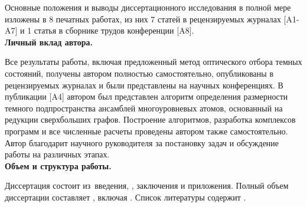 Основные положения и выводы диссертационного исследования в полной мере изложены в 8 печатных работах, из них 7 статей в рецензируемых журна­лах [A1-A7] и 1 статья в сборнике трудов конференции [A8].
\
\\[18pt]
\indent\textbf{Личный вклад автора.}

Все результаты работы, включая предложенный метод оптического отбора темных состояний, получены автором полностью самостоятельно, опубликова­ны в рецензируемых журналах и были представлены на научных конференциях. В публикации [A4] автором был представлен алгоритм определения размерно­сти темного подпространства ансамблей многоуровневых атомов, основанный на редукции сверхбольших графов. Построение алгоритмов, разработка ком­плексов программ и все численные расчеты проведены автором также само­стоятельно. Автор благодарит научного руководителя за постановку задач и обсуждение работы на различных этапах.
\
\\[18pt]
\indent\textbf{Объем и структура работы.}

Диссертация состоит из~введения,
, заключения и приложения.
%
Полный объем диссертации составляет
, включая
.
Список литературы содержит .


